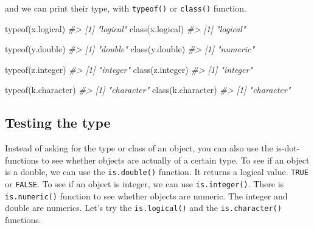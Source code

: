 \documentclass[
]{book}
\newenvironment{Shaded}{\begin{snugshade}}{\end{snugshade}}
\newcommand{\CommentTok}[1]{\textcolor[rgb]{0.56,0.35,0.01}{\textit{#1}}}
\newcommand{\FunctionTok}[1]{\textcolor[rgb]{0.00,0.00,0.00}{#1}}
\newcommand{\NormalTok}[1]{#1}
\begin{document}
and we can print their type, with \texttt{typeof()} or \texttt{class()} function.

\begin{Shaded}
\begin{Highlighting}[]
\FunctionTok{typeof}\NormalTok{(x.logical)}
\CommentTok{\#\textgreater{} [1] "logical"}
\FunctionTok{class}\NormalTok{(x.logical)}
\CommentTok{\#\textgreater{} [1] "logical"}

\FunctionTok{typeof}\NormalTok{(y.double)}
\CommentTok{\#\textgreater{} [1] "double"}
\FunctionTok{class}\NormalTok{(y.double)}
\CommentTok{\#\textgreater{} [1] "numeric"}

\FunctionTok{typeof}\NormalTok{(z.integer)}
\CommentTok{\#\textgreater{} [1] "integer"}
\FunctionTok{class}\NormalTok{(z.integer)}
\CommentTok{\#\textgreater{} [1] "integer"}

\FunctionTok{typeof}\NormalTok{(k.character)}
\CommentTok{\#\textgreater{} [1] "character"}
\FunctionTok{class}\NormalTok{(k.character)}
\CommentTok{\#\textgreater{} [1] "character"}
\end{Highlighting}
\end{Shaded}

\hypertarget{testing-the-type}{%
\subsection{Testing the type}\label{testing-the-type}}

Instead of asking for the type or class of an object, you can also use the is-dot-functions to see whether objects are actually of a certain type. To see if an object is a double, we can use the \texttt{is.double()} function. It returns a logical value. \texttt{TRUE} or \texttt{FALSE}. To see if an object is integer, we can use \texttt{is.integer()}. There is \texttt{is.numeric()} function to see whether objects are numeric. The integer and double are numerics. Let's try the \texttt{is.logical()} and the \texttt{is.character()} functions.
\end{document}
